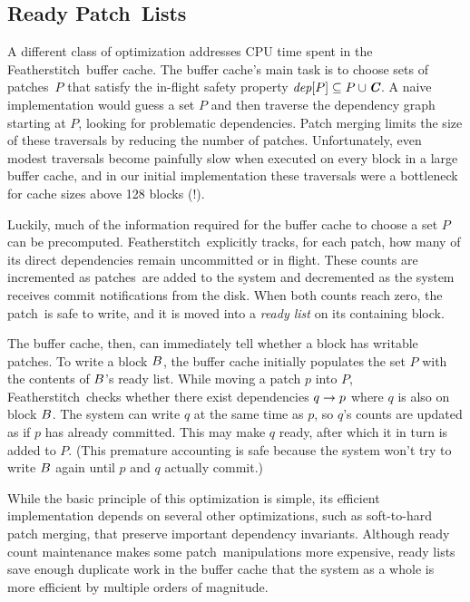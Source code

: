 \documentclass[9pt,twocolumn,letterpaper]{article}
\newcommand{\Kudos}{Featherstitch}
\newcommand{\patch}{patch}
\newcommand{\patches}{patches}
\newcommand{\Patch}{Patch}
\newcommand{\Noop}{Empty}
\begin{document}

\subsection{Ready \Patch\ Lists}
\label{sec:patch:readylist}
\label{readylist}

\newcommand{\PReady}[1]{\ensuremath{#1.\textit{ready}}}

A different class of optimization addresses CPU time spent in the
\Kudos\ buffer cache.
%
The buffer cache's main task is to choose sets of \patches\ $P$ that
satisfy the in-flight safety property $\PDepset{P} \subseteq P \cup
\PDisk$.
%
A naive implementation would guess a set $P$ and then traverse the dependency graph starting
at $P$, looking for problematic dependencies.
%
Patch merging limits the size of these traversals by reducing the number of
patches.
%
Unfortunately, even modest traversals become painfully slow when executed
on every block in a large buffer cache, and in our initial implementation
these traversals were a bottleneck for cache
sizes above 128 blocks (!).
 
Luckily, much of the information
required for the buffer cache to choose a set $P$ can be precomputed.
%
\Kudos\ explicitly tracks, for each \patch, how many of its
direct dependencies remain uncommitted or in flight.
%
These counts are incremented as \patches\ are added to the system and
decremented as the system receives commit notifications from the disk.
%
When both counts reach zero, the \patch\ is safe to write, and it is moved
into a \emph{ready list} on its containing block.
%
\begin{comment}
(\Noop\ \patches\ automatically commit when all their dependencies commit.)
\end{comment}
%
The buffer cache, then, can immediately tell whether a block has writable
patches.
%
To write a block $B$, the buffer cache initially populates the set $P$ with the
contents of $B$'s ready list.
%
While moving a patch $p$ into $P$, \Kudos\ checks whether there exist
dependencies $q \rightarrow p$ where $q$ is also on block $B$.
%
The system can write $q$ at the same time as $p$, so $q$'s
counts are updated as if $p$ has already committed.
%
This may make $q$ ready, after which it in turn is added to $P$.
%
(This premature accounting is safe because the system won't try to write
$B$ again until $p$ and $q$ actually commit.)


While the basic principle of this optimization is simple, its efficient
implementation depends on several other optimizations, such as soft-to-hard
patch merging, that preserve important dependency invariants.
%
Although ready count maintenance makes some
\patch\ manipulations more expensive, ready lists save enough duplicate work in
the buffer cache that the system as a whole is more efficient by multiple orders of
magnitude.
\end{document}
